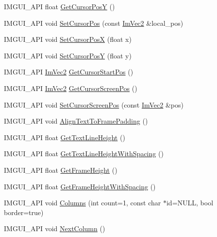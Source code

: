 \begin{DoxyCompactItemize}
\item 
I\+M\+G\+U\+I\+\_\+\+A\+PI float \hyperlink{namespace_im_gui_a86e409551f256b542166989c558d41c1}{Get\+Cursor\+PosY} ()
\item 
I\+M\+G\+U\+I\+\_\+\+A\+PI void \hyperlink{namespace_im_gui_a51ea13c986360d8a2e868dc9eeac2115}{Set\+Cursor\+Pos} (const \hyperlink{struct_im_vec2}{Im\+Vec2} \&local\+\_\+pos)
\item 
I\+M\+G\+U\+I\+\_\+\+A\+PI void \hyperlink{namespace_im_gui_a8f56616f8d0b35e6e756c0b7f198ac0f}{Set\+Cursor\+PosX} (float x)
\item 
I\+M\+G\+U\+I\+\_\+\+A\+PI void \hyperlink{namespace_im_gui_a0174d351957d5c5677ebc214dd54f499}{Set\+Cursor\+PosY} (float y)
\item 
I\+M\+G\+U\+I\+\_\+\+A\+PI \hyperlink{struct_im_vec2}{Im\+Vec2} \hyperlink{namespace_im_gui_a8ee9647de3b39fc7b77395082fc9e0cc}{Get\+Cursor\+Start\+Pos} ()
\item 
I\+M\+G\+U\+I\+\_\+\+A\+PI \hyperlink{struct_im_vec2}{Im\+Vec2} \hyperlink{namespace_im_gui_adb0db3c1ee36f5085f35890a4229ae75}{Get\+Cursor\+Screen\+Pos} ()
\item 
I\+M\+G\+U\+I\+\_\+\+A\+PI void \hyperlink{namespace_im_gui_a632bc7e15b8258f95ab0bc9b2efd5537}{Set\+Cursor\+Screen\+Pos} (const \hyperlink{struct_im_vec2}{Im\+Vec2} \&pos)
\item 
I\+M\+G\+U\+I\+\_\+\+A\+PI void \hyperlink{namespace_im_gui_ae14be3a3bec106de7c91aaa2a9a558a1}{Align\+Text\+To\+Frame\+Padding} ()
\item 
I\+M\+G\+U\+I\+\_\+\+A\+PI float \hyperlink{namespace_im_gui_aaba5637199d31ea23d4d143b30a44aff}{Get\+Text\+Line\+Height} ()
\item 
I\+M\+G\+U\+I\+\_\+\+A\+PI float \hyperlink{namespace_im_gui_aa1616f6082fd210fde8d98c511bf8f56}{Get\+Text\+Line\+Height\+With\+Spacing} ()
\item 
I\+M\+G\+U\+I\+\_\+\+A\+PI float \hyperlink{namespace_im_gui_ae560f17cf3262017cee888d1eb77f294}{Get\+Frame\+Height} ()
\item 
I\+M\+G\+U\+I\+\_\+\+A\+PI float \hyperlink{namespace_im_gui_a8de260eebd333718fa0c3b6c80258c67}{Get\+Frame\+Height\+With\+Spacing} ()
\item 
I\+M\+G\+U\+I\+\_\+\+A\+PI void \hyperlink{namespace_im_gui_a0e2889956542527c4039b6b8bf5c2a38}{Columns} (int count=1, const char $\ast$id=N\+U\+LL, bool border=true)
\item 
I\+M\+G\+U\+I\+\_\+\+A\+PI void \hyperlink{namespace_im_gui_a8f97746d6a9d59c8400c26fb7613a2ff}{Next\+Column} ()

\end{DoxyCompactItemize}
